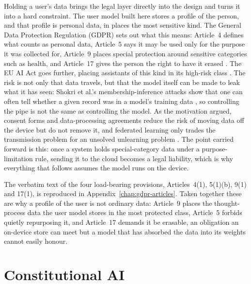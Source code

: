 Holding a user's data brings the legal layer directly into the design and turns it into a hard constraint. The user model built here stores a profile of the person, and that profile is personal data, in places the most sensitive kind. The General Data Protection Regulation (GDPR) sets out what this means: Article~4 defines what counts as personal data, Article~5 says it may be used only for the purpose it was collected for, Article~9 places special protection around sensitive categories such as health, and Article~17 gives the person the right to have it erased \cite{gdpr2016}. The EU AI Act goes further, placing assistants of this kind in its high-risk class \cite{europeanparliament2024regulationeu20241689}. The risk is not only that data travels, but that the model itself can be made to leak what it has seen: Shokri et al.'s membership-inference attacks show that one can often tell whether a given record was in a model's training data \cite{shokri2017membershipinferenceattacksmachine}, so controlling the pipe is not the same as controlling the model. As the motivation argued, consent forms and data-processing agreements reduce the risk of moving data off the device but do not remove it, and federated learning only trades the transmission problem for an unsolved unlearning problem \cite{nguyen2026computationcommunicationefficientfederated, staufer2025llmsforgetquantifyingpersonal}. The point carried forward is this: once a system holds special-category data under a purpose-limitation rule, sending it to the cloud becomes a legal liability, which is why everything that follows assumes the model runs on the device.

The verbatim text of the four load-bearing provisions, Articles~4(1), 5(1)(b), 9(1) and 17(1), is reproduced in Appendix~\ref{chap:gdpr-articles}. Taken together these are why a profile of the user is not ordinary data: Article~9 places the thought-process data the user model stores in the most protected class, Article~5 forbids quietly repurposing it, and Article~17 demands it be erasable, an obligation an on-device store can meet but a model that has absorbed the data into its weights cannot easily honour.

\section{Constitutional AI}
\label{sec:constitutional-ai}

